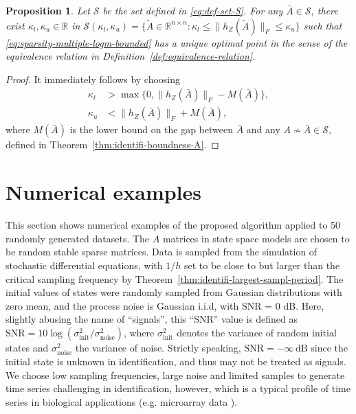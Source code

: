 \documentclass[letterpaper,10pt,journal,final]{IEEEtran}
\newtheorem{proposition}[theorem]{Proposition}
\theoremstyle{definition}
\theoremstyle{remark}
\begin{document}
\begin{proposition}
  \label{lemma:strict-opti-uniq-via-boundness}
  Let ${\mathcal{S}}$ be the set defined in \eqref{eq:def-set-S}.
For any $\bar{A} \in {\mathcal{S}}$, there exist $\kappa_l, \kappa_u \in \mathbb{R}$ in $\mathscr{S}(\kappa_l, \kappa_u) = \{\tilde{A} \in \mathbb{R}^{n \times n}: \kappa_l \leq \|h_Z(\tilde{A})\|_F \leq \kappa_u \}$ such that \eqref{eq:sparsity-multiple-logm-bounded} has a unique optimal point in the sense of the equivalence relation in Definition~\ref{def:equivalence-relation}.
\end{proposition}

\begin{proof}
  It immediately follows by choosing
  \begin{align*}
  \kappa_l &> \max\{0, \|h_Z(\bar{A})\|_F - M(\bar{A}) \},\\
  \kappa_u &< \|h_Z(\bar{A})\|_F + M(\bar{A}),
  \end{align*}
  where $M(\bar{A})$ is the lower bound on the gap between $\bar{A}$ and any $A \nsim \bar{A} \in {\mathcal{S}}$, defined in Theorem~\ref{thm:identifi-boundness-A}.
\end{proof}




\section{Numerical examples}
\label{sec:simulations}

This section shows numerical examples of the proposed algorithm applied to 50
randomly generated datasets.  The $A$ matrices in state space models are chosen
to be random stable sparse matrices. Data is sampled from the simulation of
stochastic differential equations, with $1/h$ set to be close to but larger than
the critical sampling frequency by
Theorem~\ref{thm:identifi-largest-sampl-period}. The initial values of states
were randomly sampled from Gaussian distributions with zero mean, and the
process noise is Gaussian i.i.d, with SNR = 0 dB. Here, slightly abusing the
name of ``signals'', this ``SNR'' value is defined as
$\text{SNR} = 10 \log (\sigma_\text{init}^2/\sigma_\text{noise}^2)$, where
$\sigma_\text{init}^2$ denotes the variance of random initial states and
$\sigma_\text{noise}^2$ the variance of noise. Strictly speaking,
$\text{SNR} = -\infty\, \text{dB}$ since the initial state is unknown in
identification, and thus may not be treated as signals.  We choose low sampling
frequencies, large noise and limited samples to generate time series
challenging in identification, however, which is a typical profile of time
series in biological applications (e.g. microarray data \cite{He2012}).
\end{document}
